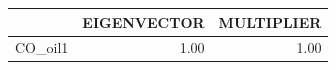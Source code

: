 \begin{tabular}{rrr}
  \hline
 & EIGENVECTOR & MULTIPLIER \\ 
  \hline
CO\_oil1 & 1.00 & 1.00 \\ 
   \hline
\end{tabular}

